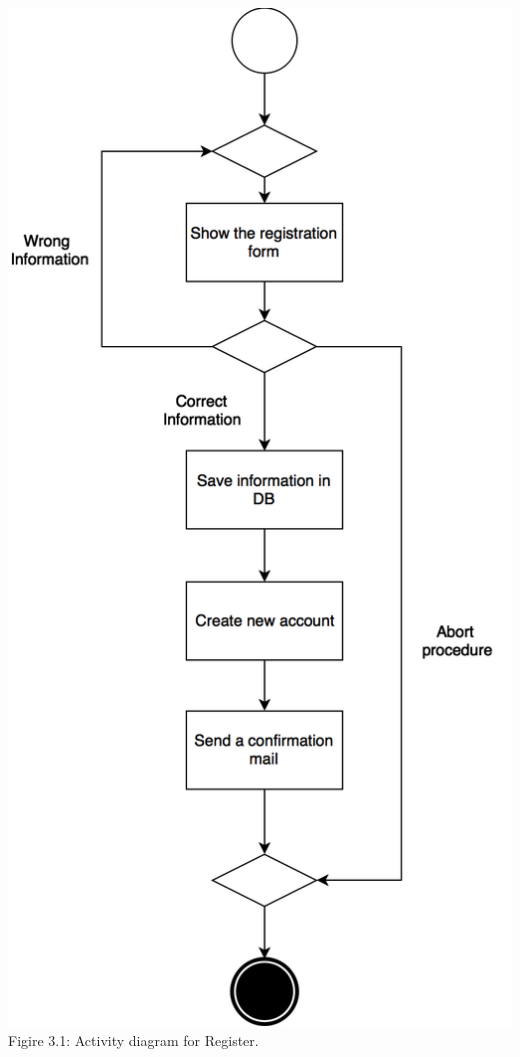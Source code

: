 \documentclass{article}
\begin{document}
	\begin{center}
		\includegraphics[scale=0.25]{img/diagrams/register_ad.png} \\  \bigskip
		Figire 3.1: Activity diagram for Register.
	\end{center}
	
\end{document}
